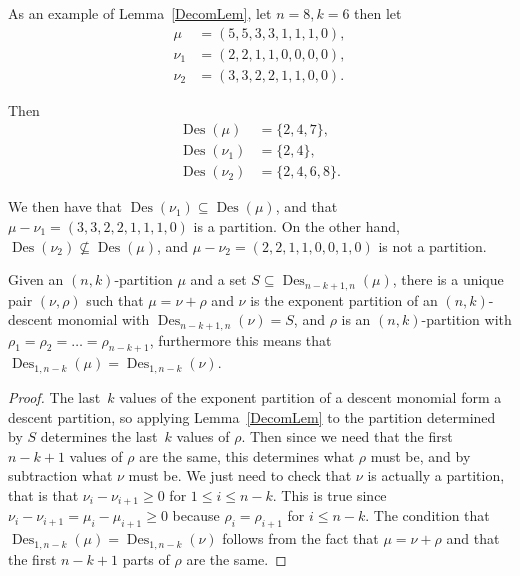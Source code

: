 \documentclass[ALCO,ThmDefs,Unicode,epreuves]{cedram}
\DeclareMathOperator{\Des}{Des}
\begin{document}
\begin{exam}
As an example of Lemma~\ref{DecomLem}, let $n=8,k=6$ then let 
\begin{align}
\mu&=(5,5,3,3,1,1,1,0),\\ 
\nu_1&=(2,2,1,1,0,0,0,0),\\\nu_2&=(3,3,2,2,1,1,0,0).
\end{align}

Then \begin{align}\Des (\mu)&=\{2,4,7\},\\\Des (\nu_1)&=\{2,4\},\\\Des (\nu_2)&=\{2,4,6,8\}.\end{align}

We then have that $\Des (\nu_1)\subseteq \Des (\mu)$, and that $\mu-\nu_1=(3,3,2,2,1,1,1,0)$ is a partition. On the other hand, 
$\Des (\nu_2)\not\subseteq \Des (\mu)$, and $\mu-\nu_2=(2,2,1,1,0,0,1,0)$ is not a partition.


\end{exam}


\begin{lemm}

\label{Decom2Lem}

Given an $(n,k)$-partition $\mu$ and a set $S\subseteq \Des _{n-k+1,n}(\mu)$, there is a unique pair $(\nu,\rho)$ such that 
$\mu=\nu+\rho$ and $\nu$ is the exponent partition of an $(n,k)$-descent monomial with $\Des _{n-k+1,n}(\nu)=S$, and $\rho$ is an 
$(n,k)$-partition with $\rho_1=\rho_2=\ldots =\rho_{n-k+1}$, furthermore this means that $\Des _{1,n-k}(\mu)=\Des _{1,n-k}(\nu)$.

	\begin{proof}

		The last~$k$ values of the exponent partition of a descent monomial form a descent partition, so applying Lemma~\ref{DecomLem} to the partition determined by $S$ determines the last~$k$ values of $\rho$. Then since we need 
that the first $n-k+1$ values of $\rho$ are the same, this determines what $\rho$ must be, and by subtraction what 
$\nu$ must be. We just need to check that $\nu$ is actually a partition, that is that $\nu_i-\nu_{i+1}\geq 0$ for 
$1\leq i\leq n-k$. This is true since $\nu_i-\nu_{i+1}=\mu_{i}-\mu_{i+1}\geq 0$ because $\rho_i=\rho_{i+1}$ for $i\leq 
n-k$. The condition that $\Des _{1,n-k}(\mu)=\Des _{1,n-k}(\nu)$ follows from the fact that $\mu=\nu+\rho$ and that the 
first $n-k+1$ parts of $\rho$ are the same. 
	\end{proof}

\end{lemm}
\end{document}

